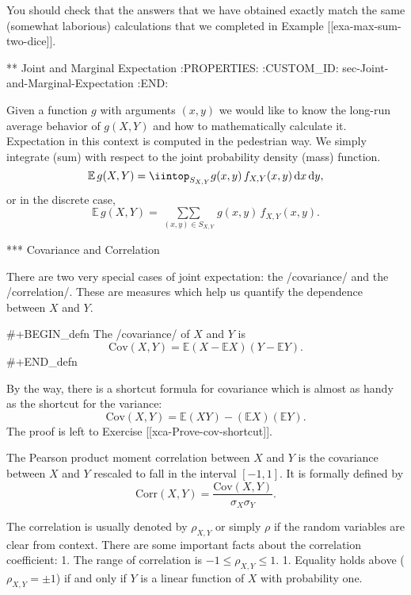 You should check that the answers that we have obtained exactly match
the same (somewhat laborious) calculations that we completed in
Example [[exa-max-sum-two-dice]].

** Joint and Marginal Expectation
:PROPERTIES:
:CUSTOM_ID: sec-Joint-and-Marginal-Expectation
:END:

Given a function \(g\) with arguments \((x,y)\) we would like to know
the long-run average behavior of \(g(X,Y)\) and how to mathematically
calculate it. Expectation in this context is computed in the
pedestrian way. We simply integrate (sum) with respect to the joint
probability density (mass) function.
\begin{equation}
\mathbb{E}\, g(X,Y)=\iintop_{S_{X,Y}}g(x,y)\, f_{X,Y}(x,y)\,\mathrm{d} x\,\mathrm{d} y,
\end{equation}
or in the discrete case,
\begin{equation}
\mathbb{E}\, g(X,Y)=\mathop{\sum\sum}\limits _{(x,y)\in S_{X,Y}}g(x,y)\, f_{X,Y}(x,y).
\end{equation}

*** Covariance and Correlation

There are two very special cases of joint expectation: the
/covariance/ and the /correlation/. These are measures which help us
quantify the dependence between \(X\) and \(Y\).

#+BEGIN_defn
The /covariance/ of \(X\) and \(Y\) is
\begin{equation}
\mbox{Cov}(X,Y)=\mathbb{E}(X-\mathbb{E} X)(Y-\mathbb{E} Y).
\end{equation}
#+END_defn

By the way, there is a shortcut formula for covariance which is almost
as handy as the shortcut for the variance:
\begin{equation}
\mbox{Cov}(X,Y)=\mathbb{E}(XY)-(\mathbb{E} X)(\mathbb{E} Y).
\end{equation}
The proof is left to Exercise [[xca-Prove-cov-shortcut]].

The Pearson product moment correlation between \(X\) and \(Y\) is the
covariance between \(X\) and \(Y\) rescaled to fall in the interval
\([-1,1]\). It is formally defined by
\begin{equation}
\mbox{Corr}(X,Y)=\frac{\mbox{Cov}(X,Y)}{\sigma_{X}\sigma_{Y}}.
\end{equation}

The correlation is usually denoted by \(\rho_{X,Y}\) or simply
\(\rho\) if the random variables are clear from context. There are
some important facts about the correlation coefficient:
1. The range of correlation is \(-1\leq\rho_{X,Y}\leq1\).
1. Equality holds above (\(\rho_{X,Y}=\pm1\)) if and only if \(Y\) is a linear function of \(X\) with probability one.

